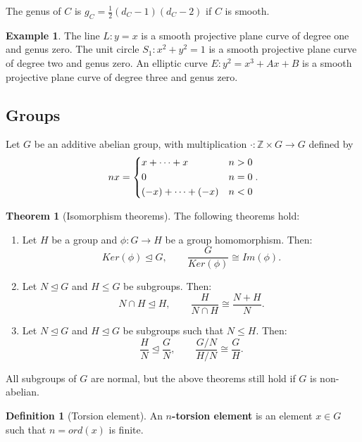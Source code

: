 \documentclass{article}
\newcommand{\Z}{\mathbb{Z}}
\newcommand{\rb}[1]{\left( #1 \right)}
\theoremstyle{definition}\newtheorem*{definition}{Definition}
\theoremstyle{definition}\newtheorem*{example}{Example}
\theoremstyle{definition}\newtheorem*{remark}{Remark}
\newtheorem{theorem}[proposition]{Theorem}
\begin{document}
The genus of $ C $ is $ g_C = \tfrac{1}{2}\rb{d_C - 1}\rb{d_C - 2} $ if $ C $ is smooth.

\begin{example}
The line $ L : y = x $ is a smooth projective plane curve of degree one and genus zero. The unit circle $ S_1 : x^2 + y^2 = 1 $ is a smooth projective plane curve of degree two and genus zero. An elliptic curve $ E : y^2 = x^3 + Ax + B $ is a smooth projective plane curve of degree three and genus zero.
\end{example}

\pagebreak

\subsection{Groups}

Let $ G $ be an additive abelian group, with multiplication $ \cdot : \Z \times G \to G $ defined by
$$ nx = \begin{dcases} x + \dots + x & n > 0 \\ 0 & n = 0 \\ \rb{-x} + \dots + \rb{-x} & n < 0 \end{dcases}. $$

\begin{theorem}[Isomorphism theorems]
The following theorems hold:
\begin{enumerate}
\item Let $ H $ be a group and $ \phi : G \to H $ be a group homomorphism. Then:
$$ Ker\rb{\phi} \trianglelefteq G, \qquad \dfrac{G}{Ker\rb{\phi}} \cong Im\rb{\phi}. $$
\item Let $ N \trianglelefteq G $ and $ H \le G $ be subgroups. Then:
$$ N \cap H \trianglelefteq H, \qquad \dfrac{H}{N \cap H} \cong \dfrac{N + H}{N}. $$
\item Let $ N \trianglelefteq G $ and $ H \trianglelefteq G $ be subgroups such that $ N \le H $. Then:
$$ \dfrac{H}{N} \trianglelefteq \dfrac{G}{N}, \qquad \dfrac{G / N}{H / N} \cong \dfrac{G}{H}. $$
\end{enumerate}
\end{theorem}

All subgroups of $ G $ are normal, but the above theorems still hold if $ G $ is non-abelian.

\begin{definition}[Torsion element]
An \textbf{$ n $-torsion element} is an element $ x \in G $ such that $ n = ord\rb{x} $ is finite.
\end{definition}
\end{document}

